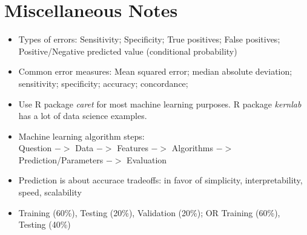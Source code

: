 \documentclass[11pt]{extarticle} %
\begin{document}
\section{Miscellaneous Notes}
\begin{itemize}
\item Types of errors: Sensitivity; Specificity; True positives; False positives; Positive/Negative predicted value (conditional probability)
\item Common error measures: Mean squared error; median absolute deviation; sensitivity; specificity; accuracy; concordance;
\item Use R package {\emph{caret}} for most machine learning purposes. R package {\emph{kernlab}} has a lot of data science examples. 
\item Machine learning algorithm steps: \\ Question $->$ Data $->$ Features $->$ Algorithms $->$ Prediction/Parameters $->$ Evaluation
\item Prediction is about accurace tradeoffs: in favor of simplicity, interpretability, speed, scalability
\item Training (60\%), Testing (20\%), Validation (20\%); OR Training (60\%), Testing (40\%)
\end{itemize}
\end{document}
